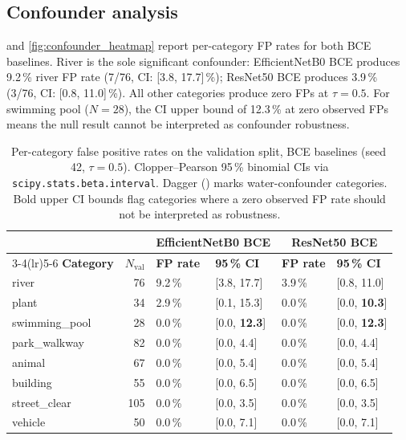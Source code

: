 \documentclass[a4paper,fleqn]{cas-sc}
\newcommand{\EffNet}{EfficientNetB0\xspace}
\newcommand{\ResNet}{ResNet50\xspace}
\newcommand{\CP}{Clopper--Pearson\xspace}
\begin{document}
\subsection{Confounder analysis}
\label{sec:results:confounder}

 and \cref{fig:confounder_heatmap} report per-category FP rates for both BCE baselines.
River is the sole significant confounder: \EffNet{} BCE produces 9.2\,\% river FP rate
(7/76, CI: [3.8, 17.7]\,\%); \ResNet{} BCE produces 3.9\,\% (3/76, CI: [0.8, 11.0]\,\%).
All other categories produce zero FPs at $\tau{=}0.5$.
For swimming pool ($N{=}28$), the CI upper bound of 12.3\,\% at zero observed FPs
means the null result cannot be interpreted as confounder robustness.

\begin{table}
  \centering
  \caption{Per-category false positive rates on the validation split,
           BCE baselines (seed\,42, $\tau{=}0.5$).
           \CP{} 95\,\% binomial CIs via \texttt{scipy.stats.beta.interval}.
           Dagger (\dag{}) marks water-confounder categories.
           Bold upper CI bounds flag categories where a zero observed
           FP rate should not be interpreted as robustness.}
  \label{tab:confounder}
  \small
  \begin{tabular}{lrll ll}
    \toprule
    & & \multicolumn{2}{c}{\textbf{\EffNet{} BCE}} &
        \multicolumn{2}{c}{\textbf{\ResNet{} BCE}} \\
    \cmidrule(lr){3-4}\cmidrule(lr){5-6}
    \textbf{Category} & \textbf{$N_\text{val}$} &
    \textbf{FP rate} & \textbf{95\,\% CI} &
    \textbf{FP rate} & \textbf{95\,\% CI} \\
    \midrule
    river\dag{}          & 76 & 9.2\,\% & [3.8, 17.7] & 3.9\,\% & [0.8, 11.0] \\
    plant                & 34 & 2.9\,\% & [0.1, 15.3] & 0.0\,\% & [0.0, \textbf{10.3}] \\
    swimming\_pool\dag{} & 28 & 0.0\,\% & [0.0, \textbf{12.3}] & 0.0\,\% & [0.0, \textbf{12.3}] \\
    park\_walkway\dag{}  & 82 & 0.0\,\% & [0.0, 4.4]  & 0.0\,\% & [0.0, 4.4] \\
    animal               & 67 & 0.0\,\% & [0.0, 5.4]  & 0.0\,\% & [0.0, 5.4] \\
    building             & 55 & 0.0\,\% & [0.0, 6.5]  & 0.0\,\% & [0.0, 6.5] \\
    street\_clear        &105 & 0.0\,\% & [0.0, 3.5]  & 0.0\,\% & [0.0, 3.5] \\
    vehicle              & 50 & 0.0\,\% & [0.0, 7.1]  & 0.0\,\% & [0.0, 7.1] \\
    \bottomrule
  \end{tabular}
\end{table}
\end{document}
